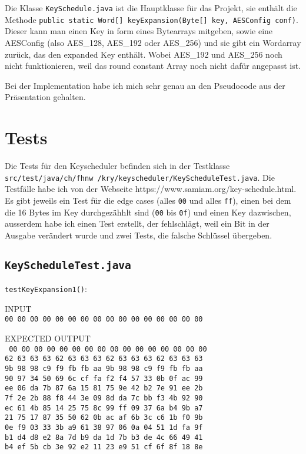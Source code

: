 \documentclass[12pt, letterpaper]{article}
\newcommand{\code}[1]{\texttt{#1}}
\begin{document}
Die Klasse \code{KeySchedule.java} ist die Hauptklasse für das Projekt, sie enthält die Methode \code{public static Word[] keyExpansion(Byte[] key, AESConfig conf)}. Dieser kann man einen Key in form eines Bytearrays mitgeben, sowie eine AESConfig (also AES\_128, AES\_192 oder AES\_256) und sie gibt ein Wordarray zurück, das den expanded Key enthält. Wobei AES\_192 und AES\_256 noch nicht funktionieren, weil das round constant Array noch nicht dafür angepasst ist.

Bei der Implementation habe ich mich sehr genau an den Pseudocode aus der Präsentation gehalten.

\newpage
\section*{Tests}
Die Tests für den Keyscheduler befinden sich in der Testklasse \code{src/test/java/ch/fhnw /kry/keyscheduler/KeyScheduleTest.java}. Die Testfälle habe ich von der Webseite https://www.samiam.org/key-schedule.html. Es gibt jeweils ein Test für die edge cases (alles \code{00} und alles \code{ff}), einen bei dem die 16 Bytes im Key durchgezähhlt sind (\code{00} bis \code{0f}) und einen Key dazwischen, ausserdem habe ich einen Test erstellt, der fehlschlägt, weil ein Bit in der Ausgabe verändert wurde und zwei Tests, die falsche Schlüssel übergeben.

\subsection*{\code{KeyScheduleTest.java}}

\code{testKeyExpansion1()}:

INPUT\\
\code{00 00 00 00 00 00 00 00 00 00 00 00 00 00 00 00}

EXPECTED OUTPUT\\
\code{
00 00 00 00 00 00 00 00 00 00 00 00 00 00 00 00\\
62 63 63 63 62 63 63 63 62 63 63 63 62 63 63 63\\
9b 98 98 c9 f9 fb fb aa 9b 98 98 c9 f9 fb fb aa\\
90 97 34 50 69 6c cf fa f2 f4 57 33 0b 0f ac 99\\
ee 06 da 7b 87 6a 15 81 75 9e 42 b2 7e 91 ee 2b\\
7f 2e 2b 88 f8 44 3e 09 8d da 7c bb f3 4b 92 90\\
ec 61 4b 85 14 25 75 8c 99 ff 09 37 6a b4 9b a7\\
21 75 17 87 35 50 62 0b ac af 6b 3c c6 1b f0 9b\\
0e f9 03 33 3b a9 61 38 97 06 0a 04 51 1d fa 9f\\
b1 d4 d8 e2 8a 7d b9 da 1d 7b b3 de 4c 66 49 41\\
b4 ef 5b cb 3e 92 e2 11 23 e9 51 cf 6f 8f 18 8e
}
\end{document}
